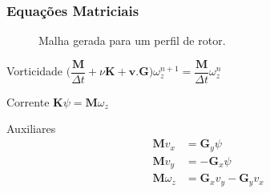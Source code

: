 \documentclass{beamer}
\begin{document}
\begin{frame}
  \frametitle{Equações Matriciais}
  
  \begin{figure}
     {\raggedleft \tiny Malha gerada para um perfil de rotor.}
  \end{figure}
  
  \begin{minipage}{.63\textwidth}
    \centering
    \begin{block}{Vorticidade}
      \centering
      $\bigg(\dfrac{\mathbf{M}}{\Delta t} + \nu \mathbf{K} + \mathbf{v.G} \bigg)\omega_z^{n+1} = \dfrac{\mathbf{M}}{\Delta t} \omega_z^n$
    \end{block}
    
    \begin{block}{Corrente}
      \centering
      $\mathbf{K} \psi = \mathbf{M} \omega_z$
    \end{block}
  \end{minipage}
  \hfill
  \begin{minipage}{.33\textwidth}
    \centering
    \begin{block}{Auxiliares}
      \vspace*{-\baselineskip}\setlength\belowdisplayshortskip{0pt} %
      \centering
      \begin{align*}
	\mathbf{M} v_x &= \mathbf{G}_y \psi \\
	\mathbf{M} v_y &=-\mathbf{G}_x \psi \\
	\mathbf{M} \omega_z &= \mathbf{G}_x v_y - \mathbf{G}_y v_x
      \end{align*}
    \end{block}
  \end{minipage}
  
\end{frame}

\end{document}
